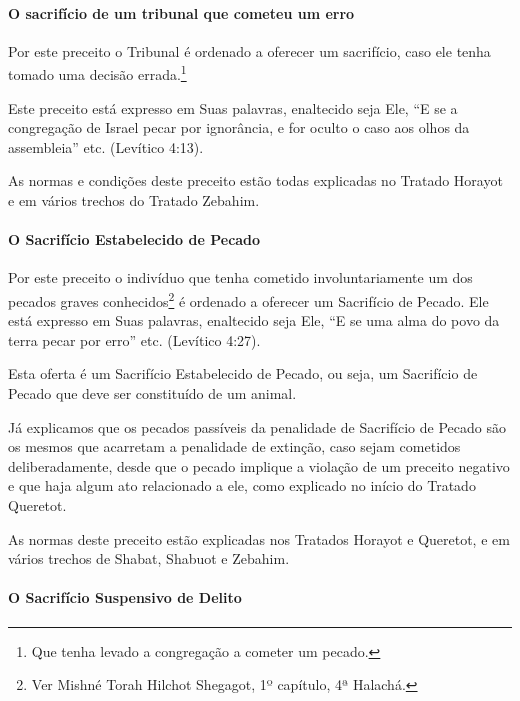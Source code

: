 \paragraph{O sacrifício de um tribunal que cometeu um erro}

Por este preceito o Tribunal é ordenado a oferecer um sacrifício, caso
ele tenha tomado uma decisão errada.\footnote{Que tenha levado a congregação a cometer um pecado.}

Este preceito está expresso em Suas palavras, enaltecido seja Ele, ``E
se a congregação de Israel pecar por ignorância, e for oculto o caso aos
olhos da assembleia'' etc. (Levítico 4:13).

As normas e condições deste preceito estão todas explicadas no Tratado
Horayot e em vários trechos do Tratado Zebahim.

\paragraph{O Sacrifício Estabelecido de Pecado}

Por este preceito o indivíduo que
tenha cometido involuntariamente um dos pecados graves
conhecidos\footnote{Ver Mishné Torah Hilchot Shegagot, 1º capítulo, 4ª Halachá.} é ordenado a oferecer um Sacrifício de
Pecado. Ele está expresso em Suas palavras, enaltecido seja Ele, ``E se
uma alma do povo da terra pecar por erro'' etc. (Levítico 4:27).

Esta oferta é um Sacrifício Estabelecido de Pecado, ou seja, um Sacrifício de Pecado que deve ser constituído de um animal.

Já explicamos que os pecados passíveis da penalidade de Sacrifício de
Pecado são os mesmos que acarretam a penalidade de extinção, caso sejam
cometidos deliberadamente, desde que o pecado implique a violação de um
preceito negativo e que haja algum ato relacionado a ele, como explicado
no início do Tratado Queretot.

As normas deste preceito estão explicadas nos Tratados Horayot e
Queretot, e em vários trechos de Shabat, Shabuot e Zebahim.

\paragraph{O Sacrifício Suspensivo de Delito}

